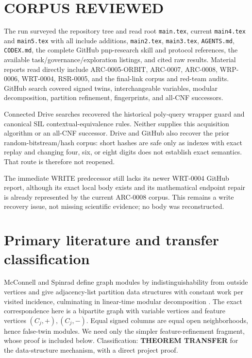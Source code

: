 \documentclass[11pt]{article}
\begin{document}
\section{CORPUS REVIEWED}
The run surveyed the repository tree and read root \texttt{main.tex}, current
\texttt{main4.tex} and \texttt{main5.tex} with all include additions,
\texttt{main2.tex}, \texttt{main3.tex}, \texttt{AGENTS.md},
\texttt{CODEX.md}, the complete GitHub pnp-research skill and protocol
references, the available task/governance/exploration listings, and cited
raw results.  Material reports read directly include ARC-0005-ORBIT,
ARC-0007, ARC-0008, WRP-0006, WRT-0004, RSR-0005, and the final-link corpus
and red-team audits.  GitHub search covered signed twins, interchangeable
variables, modular decomposition, partition refinement, fingerprints, and
all-CNF successors.

Connected Drive searches recovered the historical poly-query wrapper guard
and canonical SIL contextual-equivalence rules.  Neither supplies this
acquisition algorithm or an all-CNF successor.  Drive and GitHub also recover
the prior random-bitstream/hash corpus: short hashes are safe only as indexes
with exact replay and changing four, six, or eight digits does not establish
exact semantics.  That route is therefore not reopened.

The immediate WRITE predecessor still lacks its newer WRT-0004 GitHub report,
although its exact local body exists and its mathematical endpoint repair is
already represented by the current ARC-0008 corpus.  This remains a write
recovery issue, not missing scientific evidence; no body was reconstructed.

\section{Primary literature and transfer classification}
McConnell and Spinrad define graph modules by indistinguishability from
outside vertices and give adjacency-list partition data structures with
constant work per visited incidence, culminating in linear-time modular
decomposition \cite{arc0009McConnellSpinrad}.  The exact correspondence here
is a bipartite graph with variable vertices and feature vertices
$(C_j,+),(C_j,-)$.  Equal signed columns are equal open neighborhoods, hence
false-twin modules.  We need only the simpler feature-refinement fragment,
whose proof is included below.  Classification: \textbf{THEOREM TRANSFER}
for the data-structure mechanism, with a direct project proof.
\end{document}
